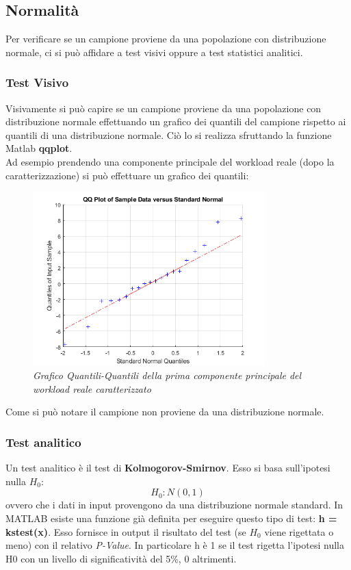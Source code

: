 \subsection{Normalità}
Per verificare se un campione proviene da una popolazione con distribuzione normale, ci si può affidare a test visivi oppure a test statistici analitici.
\subsubsection{Test Visivo}
Visivamente si può capire se un campione proviene da una popolazione con distribuzione normale effettuando un grafico dei quantili del campione rispetto ai quantili di una distribuzione normale. Ciò lo si realizza sfruttando la funzione Matlab \textbf{qqplot}.
\\Ad esempio prendendo una componente principale del workload reale (dopo la caratterizzazione) si può effettuare un grafico dei quantili:
\begin{figure}[H]
	\centering
	\includegraphics[width=0.8\textwidth]{img/hw3/test_visivo.png}
	\caption{\textit{Grafico Quantili-Quantili della prima componente principale del workload reale caratterizzato}}
\end{figure}
Come si può notare il campione non proviene da una distribuzione normale.
\subsubsection{Test analitico}
Un test analitico è il test di \textbf{Kolmogorov-Smirnov}. Esso si basa sull'ipotesi nulla $H_0$:
\begin{equation*}
	H_0 : N(0,1) 
\end{equation*}
ovvero che i dati in input provengono da una distribuzione normale standard.
In MATLAB esiste una funzione già definita per eseguire questo tipo di test: \textbf{h = kstest(x)}. Esso fornisce in output il risultato del test (se $H_0$ viene rigettata o meno) con il relativo \textit{P-Value}. In particolare h è 1 se il test rigetta l'ipotesi nulla H0 con un livello di significatività del 5\%, 0 altrimenti.
